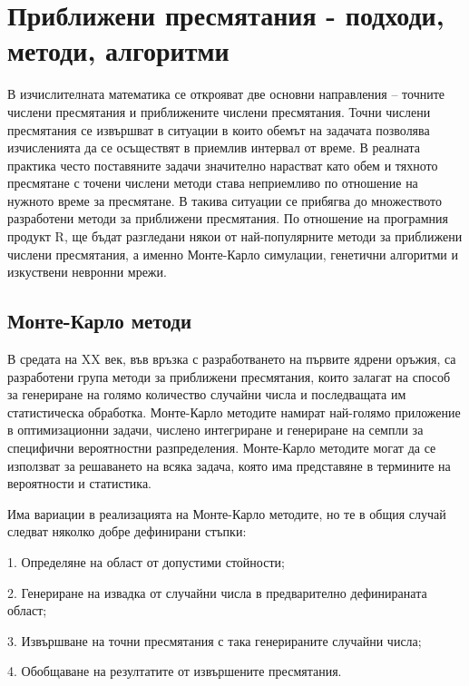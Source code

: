 ﻿\newpage
\chapter{Приближени пресмятания - подходи, методи, алгоритми}
\label{chapter10}
\thispagestyle{empty}

В изчислителната математика се открояват две основни направления – точните числени пресмятания и приближените числени пресмятания. Точни числени пресмятания се извършват в ситуации в които обемът на задачата позволява изчисленията да се осъществят в приемлив интервал от време. В реалната практика често поставяните задачи значително нарастват като обем и тяхното пресмятане с точени числени методи става неприемливо по отношение на нужното време за пресмятане. В такива ситуации се прибягва до множеството разработени методи за приближени пресмятания. По отношение на програмния продукт R, ще бъдат разгледани някои от най-популярните методи за приближени числени пресмятания, а именно Монте-Карло симулации, генетични алгоритми и изкуствени невронни мрежи.

\section{Монте-Карло методи}

В средата на XX век, във връзка с разработването на първите ядрени оръжия, са разработени група методи за приближени пресмятания, които залагат на способ за генериране на голямо количество случайни числа и последващата им статистическа обработка. Монте-Карло методите намират най-голямо приложение в оптимизационни задачи, числено интегриране и генериране на семпли за специфични вероятностни разпределения. Монте-Карло методите могат да се използват за решаването на всяка задача, която има представяне в термините на вероятности и статистика. 

Има вариации в реализацията на Монте-Карло методите, но те в общия случай следват няколко добре дефинирани стъпки:

1. Определяне на област от допустими стойности;

2. Генериране на извадка от случайни числа в предварително дефинираната област;

3. Извършване на точни пресмятания с така генерираните случайни числа;

4. Обобщаване на резултатите от извършените пресмятания.

